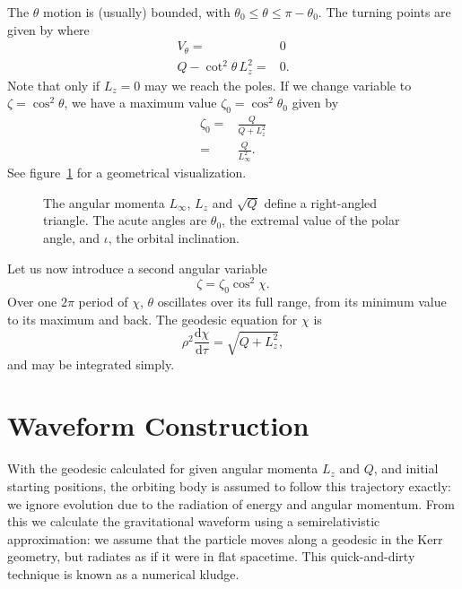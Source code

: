 \documentclass[a4paper, 11pt, titlepage, twoside]{report}
\newcommand{\figref}[1]{figure~\ref{fig:#1}}
\newcommand{\dd}{\ensuremath{\mathrm{d}}}
\newcommand{\diff}[2]{\ensuremath{\frac{\dd {#1}}{\dd {#2}}}}
\begin{document}
{The $\theta$ motion is (usually) bounded, with $\theta_0 \leq \theta \leq \pi - \theta_0$. The turning points are given by where
\begin{align}
V_\theta = {} & 0 \nonumber \\
Q - \cot^2\theta\, L_z^2= {} & 0.
\end{align}
Note that only if $L_z = 0$ may we reach the poles\cite{Wilkins1972}. If we change variable to $\zeta = \cos^2\theta$, we have a maximum value $\zeta_0 = \cos^2\theta_0$ given by
\begin{align}
\zeta_0 = {} & \frac{Q}{Q+L_z^2}\\
 = {} & \frac{Q}{L_\infty^2}.
\end{align}
See \figref{L_triangle} for a geometrical visualization.
\begin{figure}[htbp]
\begin{center}
    \caption{The angular momenta $L_\infty$, $L_z$ and $\sqrt{Q}$ define a right-angled triangle. The acute angles are $\theta_0$, the extremal value of the polar angle, and $\iota$, the orbital inclination\cite{Glampedakis2002a}.}
   \label{fig:L_triangle}
\end{center}
\end{figure}
Let us now introduce a second angular variable\cite{Drasco2004}
\begin{equation}
\zeta = \zeta_0\cos^2\chi.
\end{equation}
Over one $2\pi$ period of $\chi$, $\theta$ oscillates over its full range, from its minimum value to its maximum and back. The geodesic equation for $\chi$ is
\begin{equation}
\rho^2\diff{\chi}{\tau} = \sqrt{Q + L_z^2},
\end{equation}
and may be integrated simply.

\section{Waveform Construction}

With the geodesic calculated for given angular momenta $L_z$ and $Q$, and initial starting positions, the orbiting body is assumed to follow this trajectory exactly: we ignore evolution due to the radiation of energy and angular momentum. From this we calculate the gravitational waveform using a semirelativistic approximation\cite{Ruffini1981}: we assume that the particle moves along a geodesic in the Kerr geometry, but radiates as if it were in flat spacetime. This quick-and-dirty technique is known as a numerical kludge\cite{Babak2007}.

}
\end{document}
